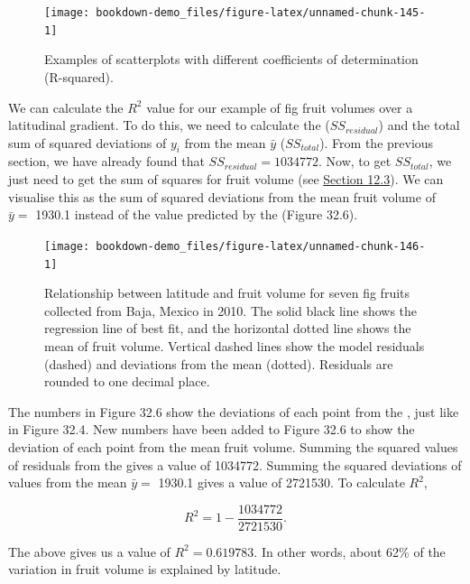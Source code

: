 \documentclass[
  openany]{krantz}
\begin{document}
\begin{figure}
\texttt{[image: bookdown-demo\_files/figure-latex/unnamed-chunk-145-1]} \caption{Examples of scatterplots with different coefficients of determination (R-squared).}\label{fig:unnamed-chunk-145}
\end{figure}

We can calculate the \(R^{2}\) value for our example of fig fruit volumes over a latitudinal gradient.
To do this, we need to calculate the  (\(SS_{residual}\)) and the total sum of squared deviations of \(y_{i}\) from the mean \(\bar{y}\) (\(SS_{total}\)).
From the previous section, we have already found that \(SS_{residual} = 1034772\).
Now, to get \(SS_{total}\), we just need to get the sum of squares for fruit volume (see \protect\hyperlink{the-variance}{Section 12.3}).
We can visualise this as the sum of squared deviations from the mean fruit volume of \(\bar{y} =\) 1930.1 instead of the value predicted by the  (Figure 32.6).

\begin{figure}
\texttt{[image: bookdown-demo\_files/figure-latex/unnamed-chunk-146-1]} \caption{Relationship between latitude and fruit volume for seven fig fruits collected from Baja, Mexico in 2010. The solid black line shows the regression line of best fit, and the horizontal dotted line shows the mean of fruit volume. Vertical dashed lines show the model residuals (dashed) and deviations from the mean (dotted). Residuals are rounded to one decimal place.}\label{fig:unnamed-chunk-146}
\end{figure}

The numbers in Figure 32.6 show the deviations of each point from the , just like in Figure 32.4.
New numbers have been added to Figure 32.6 to show the deviation of each point from the mean fruit volume.
Summing the squared values of residuals from the  gives a value of 1034772.
Summing the squared deviations of values from the mean \(\bar{y} =\) 1930.1 gives a value of 2721530.
To calculate \(R^{2}\),

\[R^{2} = 1 - \frac{1034772}{2721530}.\]

The above gives us a value of \(R^{2} = 0.619783\).
In other words, about 62\% of the variation in fruit volume is explained by latitude.

\hypertarget{section-4}{%
\section{\texorpdfstring{}{}}\label{section-4}}
\end{document}
